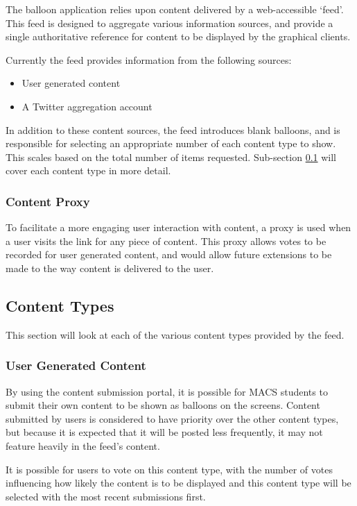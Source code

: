 The balloon application relies upon content delivered by a web-accessible `feed'. This feed is designed to aggregate various information sources, and provide a single authoritative reference for content to be displayed by the graphical clients.

Currently the feed provides information from the following sources:

\begin{itemize}
	\item User generated content
	\item A Twitter aggregation account
\end{itemize}

In addition to these content sources, the feed introduces blank balloons, and is responsible for selecting an appropriate number of each content type to show. This scales based on the total number of items requested. Sub-section \ref{sec-content-types} will cover each content type in more detail.

\subsubsection{Content Proxy}
To facilitate a more engaging user interaction with content, a proxy is used when a user visits the link for any piece of content. This proxy allows votes to be recorded for user generated content, and would allow future extensions to be made to the way content is delivered to the user.

\subsection{Content Types}\label{sec-content-types}

This section will look at each of the various content types provided by the feed.

\subsubsection{User Generated Content}
By using the content submission portal, it is possible for MACS students to submit their own content to be shown as balloons on the screens. Content submitted by users is considered to have priority over the other content types, but because it is expected that it will be posted less frequently, it may not feature heavily in the feed's content.

It is possible for users to vote on this content type, with the number of votes influencing how likely the content is to be displayed and this content type will be selected with the most recent submissions first.

